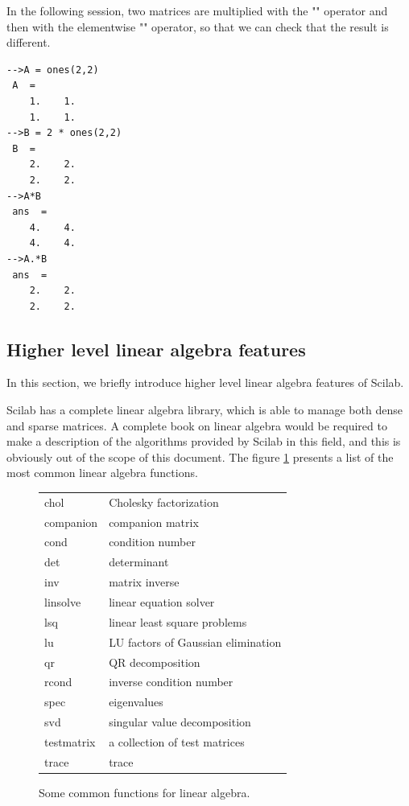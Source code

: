 In the following session, two matrices are multiplied
with the "\scivar{*}" operator and then with the elementwise "" operator,
so that we can check that the result is different.

\lstset{language=scilabscript}
\begin{lstlisting}
-->A = ones(2,2)
 A  =
    1.    1.  
    1.    1.  
-->B = 2 * ones(2,2)
 B  =
    2.    2.  
    2.    2.  
-->A*B
 ans  =
    4.    4.  
    4.    4.  
-->A.*B
 ans  =
    2.    2.  
    2.    2.  
\end{lstlisting}




\subsection{Higher level linear algebra features}
In this section, we briefly introduce higher level linear 
algebra features of Scilab.

Scilab has a complete linear algebra library, which is able to manage 
both dense and sparse matrices. A complete book on linear algebra 
would be required to make a description of the algorithms provided by 
Scilab in this field, and this is obviously out of the scope of this 
document. The figure \ref{fig-introscilab-linearalgebraoutline} presents 
a list of the most common linear algebra functions.

\begin{figure}
\begin{center}
\begin{tabular}{|ll|}
\hline
    chol & Cholesky factorization \\
    companion & companion matrix \\
    cond & condition number \\
    det & determinant \\
    inv & matrix inverse \\
    linsolve & linear equation solver \\
    lsq & linear least square problems \\
    lu & LU factors of Gaussian elimination \\
    qr & QR decomposition \\
    rcond & inverse condition number \\
    spec & eigenvalues \\
    svd & singular value decomposition \\
    testmatrix & a collection of test matrices \\
    trace & trace \\
\hline
\end{tabular}
\end{center}
\caption{Some common functions for linear algebra.}
\label{fig-introscilab-linearalgebraoutline}
\end{figure}



